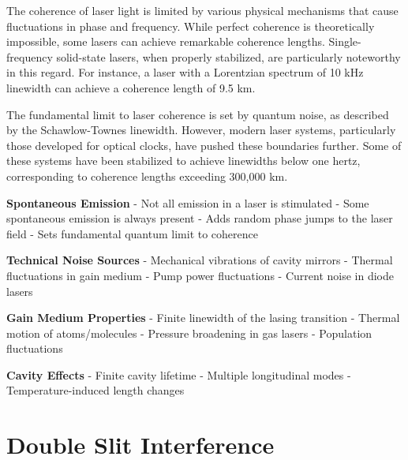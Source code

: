 \documentclass[
  a4paper,
]{book}
\begin{document}
\begin{tcolorbox}[enhanced jigsaw, breakable, toptitle=1mm, bottomrule=.15mm, colbacktitle=quarto-callout-note-color!10!white, title=\textcolor{quarto-callout-note-color}{\faInfo}\hspace{0.5em}{Partial Coherence in Lasers}, arc=.35mm, rightrule=.15mm, bottomtitle=1mm, opacityback=0, toprule=.15mm, coltitle=black, leftrule=.75mm, opacitybacktitle=0.6, colback=white, left=2mm, titlerule=0mm, colframe=quarto-callout-note-color-frame]

The coherence of laser light is limited by various physical mechanisms
that cause fluctuations in phase and frequency. While perfect coherence
is theoretically impossible, some lasers can achieve remarkable
coherence lengths. Single-frequency solid-state lasers, when properly
stabilized, are particularly noteworthy in this regard. For instance, a
laser with a Lorentzian spectrum of 10 kHz linewidth can achieve a
coherence length of 9.5 km.

The fundamental limit to laser coherence is set by quantum noise, as
described by the Schawlow-Townes linewidth. However, modern laser
systems, particularly those developed for optical clocks, have pushed
these boundaries further. Some of these systems have been stabilized to
achieve linewidths below one hertz, corresponding to coherence lengths
exceeding 300,000 km.

\textbf{Spontaneous Emission} - Not all emission in a laser is
stimulated - Some spontaneous emission is always present - Adds random
phase jumps to the laser field - Sets fundamental quantum limit to
coherence

\textbf{Technical Noise Sources} - Mechanical vibrations of cavity
mirrors - Thermal fluctuations in gain medium - Pump power fluctuations
- Current noise in diode lasers

\textbf{Gain Medium Properties} - Finite linewidth of the lasing
transition - Thermal motion of atoms/molecules - Pressure broadening in
gas lasers - Population fluctuations

\textbf{Cavity Effects} - Finite cavity lifetime - Multiple longitudinal
modes - Temperature-induced length changes

\end{tcolorbox}

\chapter{Double Slit Interference}\label{double-slit-interference}
\end{document}
